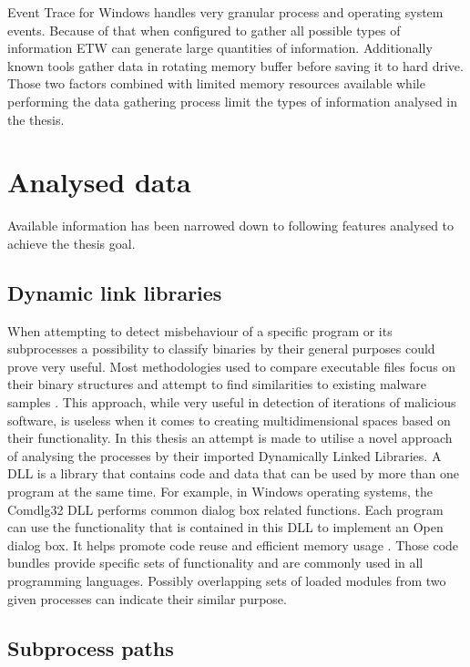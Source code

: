 \documentclass[a4paper,twoside,12pt]{book}
\begin{document}
Event Trace for Windows handles very granular process and operating system events.
Because of that when configured to gather all possible types of information ETW can generate
large quantities of information. Additionally known tools gather data in rotating memory buffer 
before saving it to hard drive. Those two factors combined with limited memory resources 
available while performing the data gathering process limit the types of information analysed 
in the thesis. 

\section{Analysed data}
Available information has been narrowed down to following features analysed to achieve the thesis
goal.

\subsection{Dynamic link libraries}

When attempting to detect misbehaviour of a specific program or its subprocesses a possibility to 
classify binaries by their general purposes could prove very useful. Most methodologies used to 
compare executable files focus on their binary structures and attempt to find similarities to 
existing malware samples \cite{bib:malwclass}. This approach, while very useful in detection of 
iterations of malicious software, is useless when it comes to creating multidimensional spaces 
based on their functionality. In this thesis an attempt is made to utilise a novel approach of 
analysing the processes by their imported Dynamically Linked Libraries. A DLL is a library that 
contains code and data that can be used by more than one program at the same time. For example, 
in Windows operating systems, the Comdlg32 DLL performs common dialog box related functions. Each 
program can use the functionality that is contained in this DLL to implement an Open dialog box. 
It helps promote code reuse and efficient memory usage \cite{bib:dll}. Those code bundles provide 
specific sets of functionality and are commonly used in all programming languages. Possibly 
overlapping sets of loaded modules from two given processes can indicate their similar purpose. 

\subsection{Subprocess paths}
\end{document}
